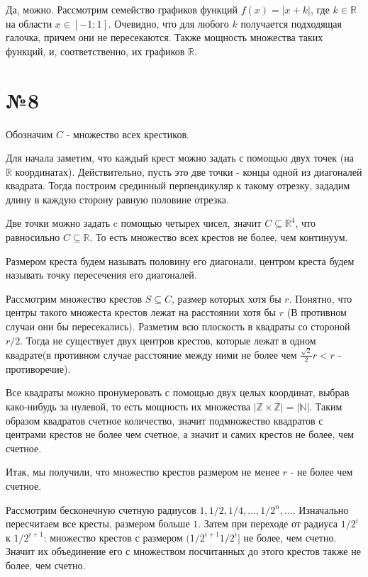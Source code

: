 \documentclass[12pt]{article}
\newcommand{\real}{\mathbb{R}}
\begin{document}
	Да, можно. Рассмотрим семейство графиков функций $f(x)=|x+k|$, где $k \in \real$ на области $x \in [-1; 1]$. Очевидно, что для любого $k$ получается подходящая галочка, причем они не пересекаются. Также мощность множества таких функций, и, соответственно, их графиков $\real$.
	
	\section*{№8}
	Обозначим $C$ - множество всех крестиков.	
	
	Для начала заметим, что каждый крест можно задать с помощью двух точек (на $\real$ координатах). Действительно, пусть это две точки - концы одной из диагоналей квадрата. Тогда построим срединный перпендикуляр к такому отрезку, зададим длину в каждую сторону равную половине отрезка.	
	
	Две точки можно задать c помощью четырех чисел, значит $C \subseteq \real^4$, что равносильно $C \subseteq \real$. То есть множество всех крестов не более, чем континуум.
	
	Размером креста будем называть половину его диагонали, центром креста будем называть точку пересечения его диагоналей.
	
	Рассмотрим множество крестов $S \subseteq C$, размер которых хотя бы $r$.
	Понятно, что центры такого множеста крестов лежат на расстоянии хотя бы $r$ (В противном случаи они бы пересекались).
	Разметим всю плоскость в квадраты со стороной $r/2$. Тогда не существует двух центров крестов, которые лежат в одном квадрате(в противном случае расстояние между ними не более чем 
	$\frac{\sqrt{2}}{2}r < r$ - противоречие).
	
	Все квадраты можно пронумеровать с помощью двух целых координат, выбрав како-нибудь за нулевой, то есть мощность их множества 
	$|\mathbb{Z} \times \mathbb{Z}| = |\mathbb{N}|$. Таким образом квадратов счетное количество, значит подмножество квадратов с центрами крестов не более чем счетное, а значит и самих крестов не более, чем счетное.
	
	Итак, мы получили, что множество крестов размером не менее $r$ - не более чем счетное.
	
	Рассмотрим бесконечную счетную радиусов $1, 1/2, 1/4, \dots, 1/2^n, \dots$. Изначально пересчитаем все кресты, размером больше $1$. Затем при переходе от радиуса $1/2^i$ к $1/2^{i+1}$: множество крестов с размером $(1/2^{i+1} 1/2^i]$ не более, чем счетно. Значит их объединение его с множеством посчитанных до этого крестов также не более, чем счетно.
	
\end{document}
